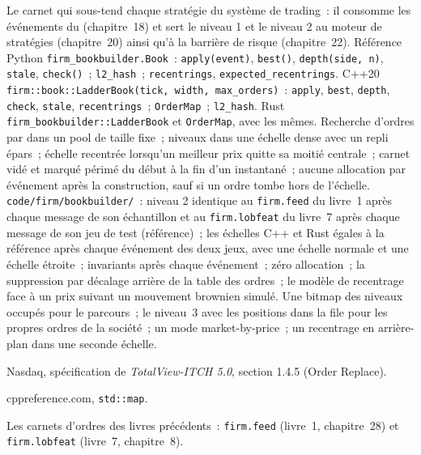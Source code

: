 \begin{build}
 Le carnet qui sous-tend chaque stratégie du système de trading~: il consomme les événements du  (chapitre~18) et
sert le niveau 1 et le niveau 2 au moteur de stratégies (chapitre~20) ainsi qu'à la barrière de risque (chapitre~22).
 Référence Python \texttt{firm\_bookbuilder.Book}~: \texttt{apply(event)}, \texttt{best()},
\texttt{depth(side, n)}, \texttt{stale}, \texttt{check()}~; \texttt{l2\_hash}~; \texttt{recentrings},
\texttt{expected\_recentrings}. C++20 \texttt{firm::book::LadderBook(tick, width, max\_orders)}~: \texttt{apply},
\texttt{best}, \texttt{depth}, \texttt{check}, \texttt{stale}, \texttt{recentrings}~; \texttt{OrderMap}~; \texttt{l2\_hash}. Rust
\texttt{firm\_bookbuilder::LadderBook} et \texttt{OrderMap}, avec les mêmes.
 Recherche d'ordres par  dans un pool de taille fixe~; niveaux dans une échelle dense avec un repli épars~;
échelle recentrée lorsqu'un meilleur prix quitte sa moitié centrale~; carnet vidé et marqué périmé du début à la fin
d'un instantané~; aucune allocation par événement après la construction, sauf si un ordre tombe hors de l'échelle.
 \texttt{code/firm/bookbuilder/}~: niveau 2 identique au \texttt{firm.feed} du livre~1 après chaque message
de son échantillon et au \texttt{firm.lobfeat} du livre~7 après chaque message de son jeu de test (référence)~; les échelles C++ et Rust
égales à la référence après chaque événement des deux jeux, avec une échelle normale et une échelle étroite~; invariants après chaque événement~; zéro
allocation~; la suppression par décalage arrière de la table des ordres~; le modèle de recentrage face à un prix suivant un mouvement brownien simulé.
 Une bitmap des niveaux occupés pour le parcours~; le niveau~3 avec les positions dans la file pour les propres ordres de la société~;
un mode market-by-price~; un recentrage en arrière-plan dans une seconde échelle.
\end{build}

\begin{omsources}
\item Nasdaq, spécification de \emph{TotalView-ITCH 5.0}, section 1.4.5 (Order Replace).
\item cppreference.com, \texttt{std::map}.
\item Les carnets d'ordres des livres précédents~: \texttt{firm.feed} (livre~1, chapitre~28) et \texttt{firm.lobfeat} (livre~7,
chapitre~8).
\end{omsources}

